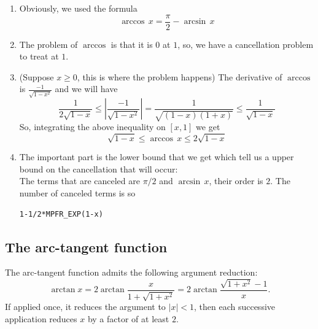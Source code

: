 \documentclass[12pt]{amsart}
\begin{document}
\begin{enumerate}
\item Obviously, we used the formula
\begin{equation*}
\arccos\,x=\frac{\pi}{2}-\arcsin\,x
\end{equation*}
\item The problem of $\arccos$ is that it is $0$ at $1$, so, we have a cancellation problem to treat at $1$.
\item (Suppose $x\geq 0$, this is where the problem happens) The derivative of $\arccos$ is $\frac{-1}{\sqrt{1-x^2}}$ and we will have
\begin{equation*}
\frac{1}{2\sqrt{1-x}}  \leq   |\frac{-1}{\sqrt{1-x^2}}|=\frac{1}{\sqrt{(1-x)(1+x)}}  \leq  \frac{1}{\sqrt{1-x}}
\end{equation*}
So, integrating the above inequality on $[x,1]$ we get
\begin{equation*}
\sqrt{1-x}\leq \arccos\,x\leq 2\sqrt{1-x}
\end{equation*}
\item The important part is the lower bound that we get which tell us a upper bound on the cancellation that will occur:\\
The terms that are canceled are $\pi/2$ and $\arcsin\,x$, their order is $2$. The number of canceled terms is so
\begin{verbatim}
1-1/2*MPFR_EXP(1-x)
\end{verbatim}
\end{enumerate}

\subsection{The arc-tangent function} %

The arc-tangent function admits the following argument reduction:
\[ \arctan x = 2 \arctan \frac{x}{1+\sqrt{1+x^2}}
             = 2 \arctan \frac{\sqrt{1+x^2}-1}{x}. \]
If applied once, it reduces the argument to $|x| < 1$, then each successive
application reduces $x$ by a factor of at least $2$.
\end{document}
